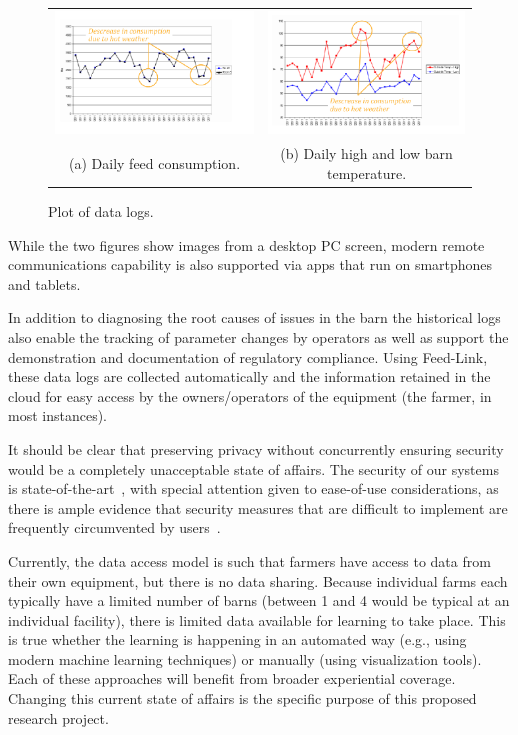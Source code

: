 \begin{figure}[t]
 \centering
\begin{tabular}{c c}
\includegraphics[width=0.45\columnwidth]{hotweather-feed-consumption-600x373} &
\includegraphics[width=0.45\columnwidth]{hotweather-daily-hi-lo-600x373} \\
(a) Daily feed consumption. & (b) Daily high and low barn temperature.
\end{tabular}
    \caption{Plot of data logs.}
    \label{graph}
\end{figure}

While the two figures show images from a desktop PC screen, modern
remote communications capability is also supported via apps that
run on smartphones and tablets.

In addition to diagnosing the root causes of issues in the barn
the historical logs also enable the tracking of
parameter changes by operators as well as support the demonstration
and documentation of regulatory compliance.
Using Feed-Link, these data logs
are collected automatically and the information retained in the
cloud for easy access by the owners/operators of the equipment (the
farmer, in most instances).

It should be clear that preserving privacy without concurrently
ensuring security would be a completely unacceptable state of affairs.
The security of our systems is
state-of-the-art~\cite{ccgss16,ccgss17b}, with special attention given
to ease-of-use considerations, as there is ample evidence that
security measures that are difficult to implement are frequently
circumvented by users~\cite{gefen2000relative,hertzum2004usable,schneier16}.

Currently, the data access model is such that farmers have
access to data from their own equipment, but there is no data sharing.
Because individual farms each typically have a limited number of
barns (between 1 and 4 would be typical at an
individual facility), there is limited data available for 
learning to take place.  This is true whether the learning is
happening in an automated way (e.g., using modern
machine learning techniques) or manually (using visualization tools).
Each of these approaches will benefit from broader experiential coverage.
Changing this current state of affairs is the specific purpose of this
proposed research project.

